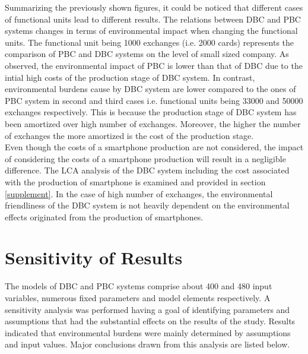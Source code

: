 \documentclass[conference]{IEEEtran}
\begin{document}
Summarizing the previously shown figures, it could be noticed that different cases of functional units lead to different results. The relations between DBC and PBC systems changes in terms of environmental impact when changing the functional units. The functional unit being 1000 exchanges (i.e. 2000 cards) represents the comparison of PBC and DBC systems on the level of small sized company. As observed, the environmental impact of PBC is lower than that of DBC due to the intial high costs of the production stage of DBC system. In contrast, environmental burdens cause by DBC system are lower compared to the ones of PBC system in second and third cases i.e. functional units being 33000 and 50000 exchanges respectively. This is because the production stage of DBC system has been amortized over high number of exchanges. Moreover, the higher the number of exchanges the more amortized is the cost of the production stage.\\ 
Even though the costs of a smartphone production are not considered, the impact of considering the costs of a smartphone production will result in a negligible difference. The LCA analysis of the DBC system including the cost associated with the production of smartphone is examined and provided in section \ref{supplement}. In the case of high number of exchanges, the environmental friendliness of the DBC system is not heavily dependent on the environmental effects originated from the production of smartphones.





\section{Sensitivity of Results}
The models of DBC and PBC systems comprise about 400 and 480 input variables, numerous ﬁxed parameters and model elements respectively. A sensitivity analysis was performed having a goal of identifying
parameters and assumptions that had the substantial effects on the results of the study. Results indicated that environmental burdens were mainly determined by assumptions and input values. Major conclusions drawn from this analysis are listed below.
\end{document}
